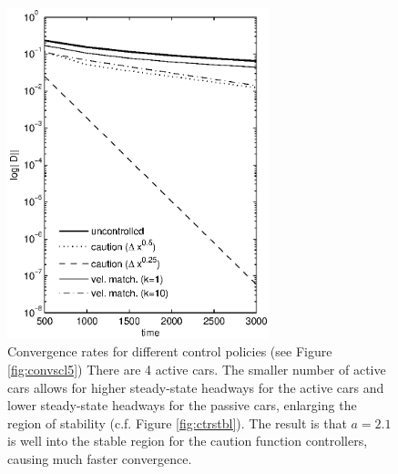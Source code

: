 \documentclass[10pt,twocolumn]{article}
\newcommand{\lm}{\fontfamily{\sfdefault}\selectfont}
\begin{document}
\begin{figure}[!h]
\lm
\begin{center}
\includegraphics[width=3in]{convscl25}
\end{center}
\caption{ \label{fig:convscl25} Convergence rates for different control policies (see Figure \ref{fig:convscl5}) There are 4 active cars. The smaller number of active cars allows for higher steady-state headways for the active cars and lower steady-state headways for the passive cars, enlarging the region of stability (c.f. Figure \ref{fig:ctrstbl}). The result is that $a=2.1$ is well into the stable region for the caution function controllers, causing much faster convergence.}
\end{figure}
\end{document}
